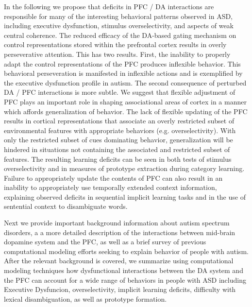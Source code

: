 

In the following we propose that deficits in PFC / DA interactions are responsible for many of the interesting behavioral patterns observed in ASD, including executive dysfunction, stimulus overselectivity, and aspects of weak central coherence.  The reduced efficacy of the DA-based gating mechanism on control representations stored within the prefrontal cortex results in overly perseverative attention.  This has two results.  First, the inability to properly adapt the control representations of the PFC produces inflexible behavior.  This behavioral perseveration is manifested in inflexible actions and is exemplified by the executive dysfunction profile in autism.  The second consequence of perturbed DA / PFC interactions is more subtle. We suggest that flexible adjustment of PFC plays an important role in shaping associational areas of cortex in a manner which affords generalization of behavior.  The lack of flexible updating of the PFC results in cortical representations that associate an overly restricted subset of environmental features with appropriate behaviors (e.g. overselectivity).  With only the restricted subset of cues dominating behavior, generalization will be hindered in situations not containing the associated and restricted subset of features.  The resulting learning deficits can be seen in both tests of stimulus overselectivity and in measures of prototype extraction during category learning.  Failure to appropriately update the contents of PFC can also result in an inability to appropriately use temporally extended context information, explaining observed deficits in sequential implicit learning tasks and in the use of sentential context to disambiguate words. 

Next we provide important background information about autism spectrum disorders, a a more detailed description of the interactions between mid-brain dopamine system and the PFC, as well as a brief survey of previous computational modeling efforts seeking to explain behavior of people with autism.  After the relevant background is covered, we summarize using computational modeling techniques how dysfunctional interactions between the DA system and the PFC can account for a wide range of behaviors in people with ASD including Executive Dysfuncion, overselectivity, implicit learning deficits, difficulty with lexical disambiguation, as well as prototype formation.  

